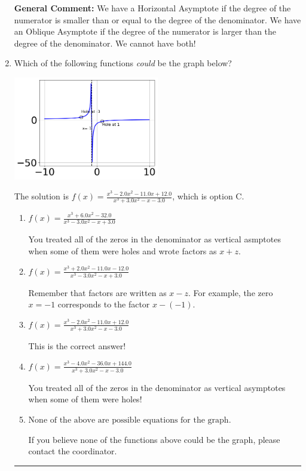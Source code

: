 \documentclass{extbook}[14pt]
\newcommand{\litem}[1]{\item #1

\rule{\textwidth}{0.4pt}}
\begin{document}
\begin{enumerate}
{\textbf{General Comment:} We have a Horizontal Asymptote if the degree of the numerator is smaller than or equal to the degree of the denominator. We have an Oblique Asymptote if the degree of the numerator is larger than the degree of the denominator. We cannot have both!
}
\litem{
Which of the following functions \textit{could} be the graph below?

\begin{center}
    \includegraphics[width=0.5\textwidth]{../Figures/identifyGraphOfRationalFunctionCopyB.png}
\end{center}


The solution is \( f(x)=\frac{x^{3} -2.0 x^{2} -11.0 x + 12.0}{x^{3} +3.0 x^{2} -x -3.0} \), which is option C.\begin{enumerate}[label=\Alph*.]
\item \( f(x)=\frac{x^{3} +6.0 x^{2} -32.0}{x^{3} -3.0 x^{2} -x + 3.0} \)

You treated all of the zeros in the denominator as vertical asmptotes when some of them were holes and wrote factors as $x+z$.
\item \( f(x)=\frac{x^{3} +2.0 x^{2} -11.0 x -12.0}{x^{3} -3.0 x^{2} -x + 3.0} \)

Remember that factors are written as $x-z$. For example, the zero $x=-1$ corresponds to the factor $x-(-1)$.
\item \( f(x)=\frac{x^{3} -2.0 x^{2} -11.0 x + 12.0}{x^{3} +3.0 x^{2} -x -3.0} \)

This is the correct answer!
\item \( f(x)=\frac{x^{3} -4.0 x^{2} -36.0 x + 144.0}{x^{3} +3.0 x^{2} -x -3.0} \)

You treated all of the zeros in the denominator as vertical asymptotes when some of them were holes!
\item \( \text{None of the above are possible equations for the graph.} \)

If you believe none of the functions above could be the graph, please contact the coordinator.
\end{enumerate}

}
\end{enumerate}
\end{document}
